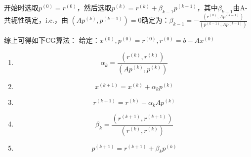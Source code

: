 \documentclass[a4paper]{article}
\begin{document}
开始时选取$p^{(0)}=r^{(0)}$，然后选取$p^{(k)}=r^{(k)}+\beta_{k-1}p^{(k-1)} $，其中$\beta_{k-1} $由A-共轭性确定，i.e.，由
$(Ap^{(k)}, p^{(k-1)})=0$确定为：$\beta_{k-1}=-\frac{(r^{(k)}, Ap^{(k-1)})}{(p^{(k-1)}, Ap^{(k-1)})} $

综上可得如下CG算法：
给定：$x^{(0)},p^{(0)}=r^{(0)}, r^{(0)}=b-Ax^{(0)} $
\begin{enumerate}
  \item $$\alpha_k = \frac{(r^{(k)}, r^{(k)})}{(Ap^{(k)}, p^{(k)})}$$
  \item $$x^{(k+1)}=x^{(k)}+\alpha_k p^{(k)} $$
  \item $$r^{(k+1)}=r^{(k)}-\alpha_kAp^{(k)} $$
  \item $$\beta_k = \frac{(r^{(k+1)}, r^{(k+1)})}{(r^{(k)}, r^{(k)})} $$
  \item $$p^{(k+1)}=r^{(k+1)}+\beta_k p^{(k)} $$
\end{enumerate}
\end{document}
